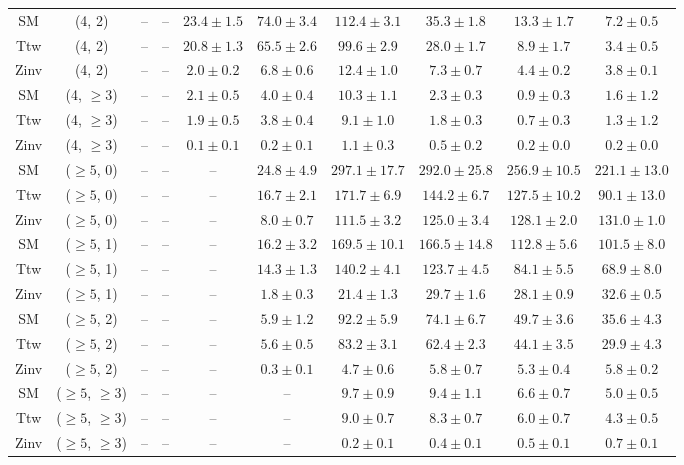 \begin{table}[h!]
{\begin{tabular}{cccccccccc}
	SM & (4, 2) & -- & -- & $23.4\pm 1.5$ & $74.0\pm 3.4$ & $112.4\pm 3.1$ & $35.3\pm 1.8$ & $13.3\pm 1.7$ & $7.2\pm 0.5$ \\[0.5ex] 
	Ttw & (4, 2) & -- & -- & $20.8\pm 1.3$ & $65.5\pm 2.6$ & $99.6\pm 2.9$ & $28.0\pm 1.7$ & $8.9\pm 1.7$ & $3.4\pm 0.5$ \\[0.5ex] 
	Zinv & (4, 2) & -- & -- & $2.0\pm 0.2$ & $6.8\pm 0.6$ & $12.4\pm 1.0$ & $7.3\pm 0.7$ & $4.4\pm 0.2$ & $3.8\pm 0.1$ \\[0.5ex] 
	SM & (4, $\ge3$) & -- & -- & $2.1\pm 0.5$ & $4.0\pm 0.4$ & $10.3\pm 1.1$ & $2.3\pm 0.3$ & $0.9\pm 0.3$ & $1.6\pm 1.2$ \\[0.5ex] 
	Ttw & (4, $\ge3$) & -- & -- & $1.9\pm 0.5$ & $3.8\pm 0.4$ & $9.1\pm 1.0$ & $1.8\pm 0.3$ & $0.7\pm 0.3$ & $1.3\pm 1.2$ \\[0.5ex] 
	Zinv & (4, $\ge3$) & -- & -- & $0.1\pm 0.1$ & $0.2\pm 0.1$ & $1.1\pm 0.3$ & $0.5\pm 0.2$ & $0.2\pm 0.0$ & $0.2\pm 0.0$ \\[0.5ex] 
	SM & ($\ge5$, 0) & -- & -- & -- & $24.8\pm 4.9$ & $297.1\pm 17.7$ & $292.0\pm 25.8$ & $256.9\pm 10.5$ & $221.1\pm 13.0$ \\[0.5ex] 
	Ttw & ($\ge5$, 0) & -- & -- & -- & $16.7\pm 2.1$ & $171.7\pm 6.9$ & $144.2\pm 6.7$ & $127.5\pm 10.2$ & $90.1\pm 13.0$ \\[0.5ex] 
	Zinv & ($\ge5$, 0) & -- & -- & -- & $8.0\pm 0.7$ & $111.5\pm 3.2$ & $125.0\pm 3.4$ & $128.1\pm 2.0$ & $131.0\pm 1.0$ \\[0.5ex] 
	SM & ($\ge5$, 1) & -- & -- & -- & $16.2\pm 3.2$ & $169.5\pm 10.1$ & $166.5\pm 14.8$ & $112.8\pm 5.6$ & $101.5\pm 8.0$ \\[0.5ex] 
	Ttw & ($\ge5$, 1) & -- & -- & -- & $14.3\pm 1.3$ & $140.2\pm 4.1$ & $123.7\pm 4.5$ & $84.1\pm 5.5$ & $68.9\pm 8.0$ \\[0.5ex] 
	Zinv & ($\ge5$, 1) & -- & -- & -- & $1.8\pm 0.3$ & $21.4\pm 1.3$ & $29.7\pm 1.6$ & $28.1\pm 0.9$ & $32.6\pm 0.5$ \\[0.5ex] 
	SM & ($\ge5$, 2) & -- & -- & -- & $5.9\pm 1.2$ & $92.2\pm 5.9$ & $74.1\pm 6.7$ & $49.7\pm 3.6$ & $35.6\pm 4.3$ \\[0.5ex] 
	Ttw & ($\ge5$, 2) & -- & -- & -- & $5.6\pm 0.5$ & $83.2\pm 3.1$ & $62.4\pm 2.3$ & $44.1\pm 3.5$ & $29.9\pm 4.3$ \\[0.5ex] 
	Zinv & ($\ge5$, 2) & -- & -- & -- & $0.3\pm 0.1$ & $4.7\pm 0.6$ & $5.8\pm 0.7$ & $5.3\pm 0.4$ & $5.8\pm 0.2$ \\[0.5ex] 
	SM & ($\ge5$, $\ge3$) & -- & -- & -- & -- & $9.7\pm 0.9$ & $9.4\pm 1.1$ & $6.6\pm 0.7$ & $5.0\pm 0.5$ \\[0.5ex] 
	Ttw & ($\ge5$, $\ge3$) & -- & -- & -- & -- & $9.0\pm 0.7$ & $8.3\pm 0.7$ & $6.0\pm 0.7$ & $4.3\pm 0.5$ \\[0.5ex] 
	Zinv & ($\ge5$, $\ge3$) & -- & -- & -- & -- & $0.2\pm 0.1$ & $0.4\pm 0.1$ & $0.5\pm 0.1$ & $0.7\pm 0.1$ \\[0.5ex] 
	\hline
	\hline
\end{tabular}}
\end{table}
